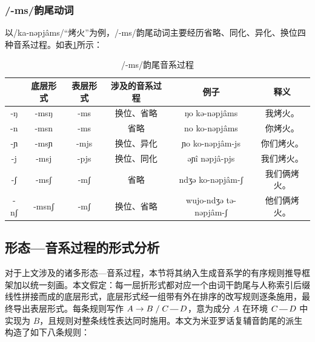 \subsubsection{/-ms/韵尾动词}

以/ka-nəpjâms/“烤火”为例，/-ms/韵尾动词主要经历省略、同化、异化、换位四种音系过程。如表\ref{mscodapro}所示：

\begin{table}[H]
\vspace{5pt}
    \centering
    \caption{/-ms/韵尾音系过程}
    \label{mscodapro}
\begin{tabular}{c|ccccc}
\toprule
    & 底层形式 & 表层形式 & 涉及的音系过程 & 例子                      & 释义     \\
\midrule
-ŋ  & -msŋ  & -ms  & 换位、省略      & ŋo kə-nəpjâms         & 我烤火。   \\
-n  & -msn  & -ms  & 省略      & no ko-nəpjâms         & 你烤火。   \\
-ɲ  & -msɲ  & -mjs & 换位、异化   & ɲo ko-nəpjâm-js       & 你们烤火。  \\
-j  & -msj  & -pjs & 换位、同化   & əɲî nəpjâ-pjs        & 我们烤火。  \\
-ʃ  & -msʃ  & -mʃ  & 省略      & ndʒə ko-nəpjâm-ʃ      & 我们俩烤火。 \\
-nʃ & -msnʃ & -mʃ  & 换位、省略      & wujo-ndʒə tə-nəpjâm-ʃ & 他们俩烤火。\\
\bottomrule
\end{tabular}
\end{table}

\subsection{形态—音系过程的形式分析}

对于上文涉及的诸多形态—音系过程，本节将其纳入生成音系学的有序规则推导框架\parencite{Chomsky1968-sp,hayes2011introductory}加以统一刻画。本文假定：每一屈折形式都对应一个由词干韵尾与人称索引后缀线性拼接而成的底层形式，底层形式经一组带有外在排序的改写规则逐条施用，最终导出表层形式。每条规则写作 $A\rightarrow B\;/\;C\,\rule[2pt]{1em}{0.4pt}\,D$，意为成分 $A$ 在环境 $C\,\rule[2pt]{1em}{0.4pt}\,D$ 中实现为 $B$，且规则对整条线性表达同时施用\parencite{Chomsky1968-sp}。本文为米亚罗话复辅音韵尾的派生构造了如下八条规则：

